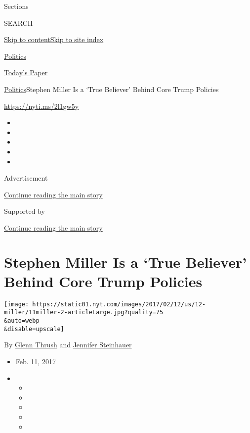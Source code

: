 Sections

SEARCH

\protect\hyperlink{site-content}{Skip to
content}\protect\hyperlink{site-index}{Skip to site index}

\href{https://www.nytimes.com/section/politics}{Politics}

\href{https://myaccount.nytimes.com/auth/login?response_type=cookie\&client_id=vi}{}

\href{https://www.nytimes.com/section/todayspaper}{Today's Paper}

\href{/section/politics}{Politics}\textbar{}Stephen Miller Is a `True
Believer' Behind Core Trump Policies

\url{https://nyti.ms/2l1gw5y}

\begin{itemize}
\item
\item
\item
\item
\item
\end{itemize}

Advertisement

\protect\hyperlink{after-top}{Continue reading the main story}

Supported by

\protect\hyperlink{after-sponsor}{Continue reading the main story}

\hypertarget{stephen-miller-is-a-true-believer-behind-core-trump-policies}{%
\section{Stephen Miller Is a `True Believer' Behind Core Trump
Policies}\label{stephen-miller-is-a-true-believer-behind-core-trump-policies}}

\texttt{[image: https://static01.nyt.com/images/2017/02/12/us/12-miller/11miller-2-articleLarge.jpg?quality=75\\\&auto=webp\\\&disable=upscale]}

By \href{https://www.nytimes.com/by/glenn-thrush}{Glenn Thrush} and
\href{http://www.nytimes.com/by/jennifer-steinhauer}{Jennifer
Steinhauer}

\begin{itemize}
\item
  Feb. 11, 2017
\item
  \begin{itemize}
  \item
  \item
  \item
  \item
  \item
  \end{itemize}
\end{itemize}

